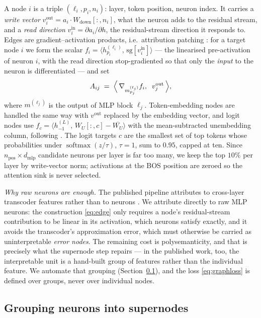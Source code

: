 \documentclass{article}
\DeclareMathOperator{\softmax}{softmax}
\begin{document}
A node $i$ is a triple $(\ell_i, p_i, n_i)$: layer, token position, neuron index. It carries a
\emph{write vector} $v^{\mathrm{out}}_i = a_i \cdot W_{\mathrm{down}}[:,n_i]$, what the neuron adds
to the residual stream, and a \emph{read direction} $v^{\mathrm{in}}_i = \partial a_i / \partial h$,
the residual-stream direction it responds to. Edges are gradient--activation products, i.e.\
attribution patching \citep{nanda2023attribution}: for a target node $i$ we form the scalar
$f_i = \langle h^{(\ell_i)}_{p_i},\, \mathrm{sg}[v^{\mathrm{in}}_i]\rangle$ --- the linearised
pre-activation of neuron $i$, with the read direction stop-gradiented so that only the \emph{input}
to the neuron is differentiated --- and set
\begin{equation}
  A_{ij} \;=\; \Bigl\langle\, \nabla_{m^{(\ell_j)}_{p_j}} f_i,\;\; v^{\mathrm{out}}_j \,\Bigr\rangle,
  \label{eq:edge}
\end{equation}
where $m^{(\ell_j)}$ is the output of MLP block $\ell_j$. Token-embedding nodes are handled the same
way with $v^{\mathrm{out}}$ replaced by the embedding vector, and logit nodes use
$f_c = \langle h^{(L)}_{-1},\, W_U[:,c] - \overline{W_U}\rangle$ with the mean-subtracted
unembedding column, following \citet{ameisen2025circuit}. The logit targets $c$ are the smallest set
of top tokens whose probabilities under $\softmax(z/\tau)$, $\tau = 1$, sum to $0.95$, capped at
ten. Since $n_{\mathrm{pos}} \times d_{\mathrm{mlp}}$ candidate neurons per layer is far too many,
we keep the top $10\%$ per layer by write-vector norm; activations at the BOS position are zeroed so
the attention sink is never selected.

\emph{Why raw neurons are enough.} The published pipeline attributes to cross-layer transcoder
features rather than to neurons \citep{dunefsky2024transcoders}. We attribute directly to raw MLP
neurons: the construction \eqref{eq:edge} only requires a node's residual-stream contribution to be
linear in its activation, which neurons satisfy exactly, and it avoids the transcoder's
approximation error, which must otherwise be carried as uninterpretable \emph{error nodes}. The
remaining cost is polysemanticity, and that is precisely what the supernode step repairs --- in the
published work, too, the interpretable unit is a hand-built group of features rather than the
individual feature. We automate that grouping (Section~\ref{sec:supernodes}), and the loss
\eqref{eq:graphloss} is defined over groups, never over individual nodes.

\subsection{Grouping neurons into supernodes}
\label{sec:supernodes}
\end{document}

